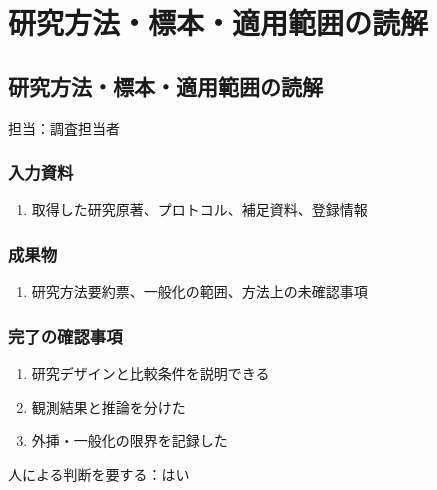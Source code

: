 \documentclass[a4paper,11pt]{article}
\begin{document}
\section{研究方法・標本・適用範囲の読解}
\subsection{研究方法・標本・適用範囲の読解}
\par 担当：調査担当者\par\medskip
\subsubsection*{入力資料}
\begin{enumerate}[leftmargin=2em,itemsep=0.35em]
\item 取得した研究原著、プロトコル、補足資料、登録情報
\end{enumerate}
\subsubsection*{成果物}
\begin{enumerate}[leftmargin=2em,itemsep=0.35em]
\item 研究方法要約票、一般化の範囲、方法上の未確認事項
\end{enumerate}
\subsubsection*{完了の確認事項}
\begin{enumerate}[leftmargin=2em,itemsep=0.35em]
\item 研究デザインと比較条件を説明できる
\item 観測結果と推論を分けた
\item 外挿・一般化の限界を記録した
\end{enumerate}
\par 人による判断を要する：はい\par\medskip
\end{document}
